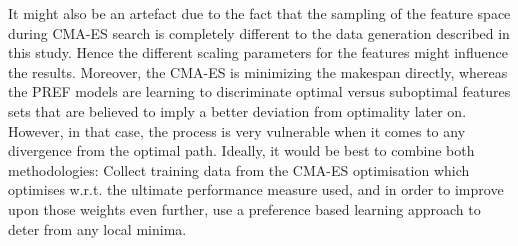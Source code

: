 \documentclass[letterpaper]{article}
\begin{document}
It might also be an artefact due to the fact that the sampling of the feature space during CMA-ES search is completely different to the data generation described in this study. Hence the different scaling parameters for the features might influence the results. Moreover, the CMA-ES is minimizing the makespan directly, whereas the PREF models are learning to discriminate optimal versus suboptimal features sets that  are believed to imply a better deviation from optimality later on. However, in that case, the process is very vulnerable when it comes to any divergence from the optimal path. 
Ideally,  it would be best to combine both methodologies: Collect training data from the CMA-ES optimisation which optimises w.r.t. the ultimate performance measure used, and in order to improve upon those weights even further, use a preference based learning approach to deter from any local minima. 
\end{document}
